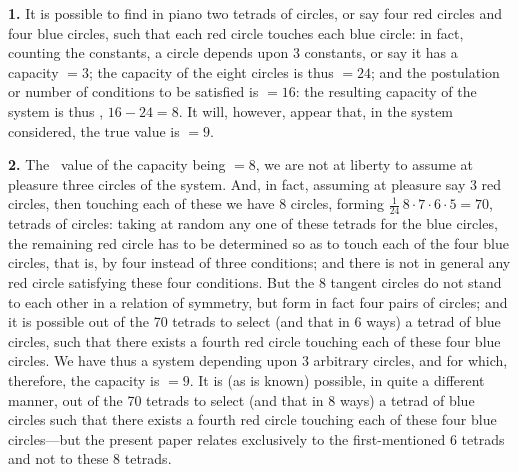 \documentclass[11pt,a4paper]{book}
\begin{document}
{{{\textbf{1.} It is possible to find in piano two tetrads of circles, or say four red circles and four blue circles, such that each red circle touches each blue circle: in fact, counting the constants, a circle depends upon 3 constants, or say it has a capacity $=3$; the capacity of the eight circles is thus $=24$; and the postulation or number of conditions to be satisfied is $=16$: the resulting capacity of the system is thus \primd, $16-24=8$. It will, however, appear that, in the system considered, the true value is $=9$.

\textbf{2.} The \primd\ value of the capacity being $=8$, we are not at liberty to assume at pleasure three circles of the system. And, in fact, assuming at pleasure say 3 red circles, then touching each of these we have 8 circles, forming $\frac{1}{24}\, 8 \cdot 7 \cdot 6 \cdot 5 = 70$, tetrads of circles: taking at random any one of these tetrads for the blue circles, the remaining red circle has to be determined so as to touch each of the four blue circles, that is, by four instead of three conditions; and there is not in general any red circle satisfying these four conditions. But the 8 tangent circles do not stand to each other in a relation of symmetry, but form in fact four pairs of circles; and it is possible out of the 70 tetrads to select (and that in 6 ways) a tetrad of blue circles, such that there exists a fourth red circle touching each of these four blue circles. We have thus a system depending upon 3 arbitrary circles, and for which, therefore, the capacity is $=9$. It is (as is known) possible, in quite a different manner, out of the 70 tetrads to select (and that in 8 ways) a tetrad of blue circles such that there exists a fourth red circle touching each of these four blue circles---but the present paper relates exclusively to the first-mentioned 6 tetrads and not to these 8 tetrads.

}}}
\end{document}
